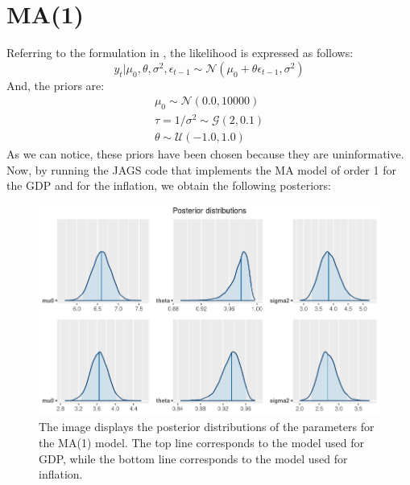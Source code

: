 \section*{MA(1)}
\label{MA(1)}
Referring to the formulation in , the likelihood is expressed as follows:
$$
y_t | \mu_0, \theta, \sigma^2, \epsilon_{t-1} \sim \mathcal{N}(\mu_0 + \theta \epsilon_{t-1},\sigma^2)
$$
And, the priors are:
\begin{equation}
    \begin{split}
        \mu_0 \sim \mathcal{N}(0.0, 10000) \\
        \tau = 1 / \sigma^2 \sim \mathcal{G}(2, 0.1) \\
        \theta \sim \mathcal{U}(-1.0, 1.0)
    \end{split}
\end{equation}
As we can notice, these priors have been chosen because they are uninformative. \\
Now, by running the JAGS code that implements the MA model of order 1 for the GDP and for the inflation, we obtain the following posteriors: \\
\begin{figure}[h]
    \centering
    \includegraphics[width=\textwidth]{../Images/3-MA/posteriors.png}
    \caption{The image displays the posterior distributions of the parameters for the MA(1) model. The top line corresponds to the model used for GDP, while the bottom line corresponds to the model used for inflation.}
    \label{fig:MA_posteriors}
\end{figure}

